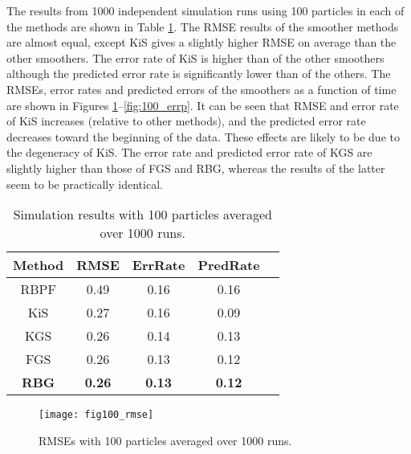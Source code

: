 \documentclass[twocolumn]{autart}    %
\begin{document}
The results from 1000 independent simulation runs using 100 particles
in each of the methods are shown in Table \ref{tbl:res100}. The RMSE
results of the smoother methods are almost equal, except KiS gives a slightly
higher RMSE on average than the other smoothers. The error rate of KiS
is higher than of the other smoothers although the predicted error
rate is significantly lower than of the others. The RMSEs, error rates
and predicted errors of the smoothers as a function of time are shown in
Figures \ref{fig:100_rmse}--\ref{fig:100_errp}. It can be seen that
RMSE and error rate of KiS increases (relative to other methods), and
the predicted error rate decreases toward the beginning of the data.
These effects are likely to be due to the degeneracy of KiS. The error
rate and predicted error rate of KGS are slightly higher than those of FGS
and RBG, whereas the results of the latter seem to be practically
identical.

%
\begin{table}[htb!]
\begin{center}
\begin{tabular}{|c|c|c|c|c|}
\hline
Method & RMSE              & ErrRate       &   PredRate \\
\hline
\hline
RBPF   & 0.49 & 0.16 & 0.16 \\ \hline
KiS    & 0.27 & 0.16 & 0.09 \\ \hline
KGS    & 0.26 & 0.14 & 0.13 \\ \hline
FGS    & 0.26 & 0.13 & 0.12 \\ \hline
{\bf RBG} & {\bf 0.26} & {\bf 0.13} & {\bf 0.12} \\ \hline
\end{tabular}
\end{center}
\caption{Simulation results with 100 particles averaged over 1000 runs. }
\label{tbl:res100}
\end{table}

\begin{figure}[htb!]
\begin{center}
\texttt{[image: fig100\_rmse]}
\end{center}
\caption{RMSEs with 100 particles averaged over 1000 runs.}
\label{fig:100_rmse}
\end{figure}
\end{document}
